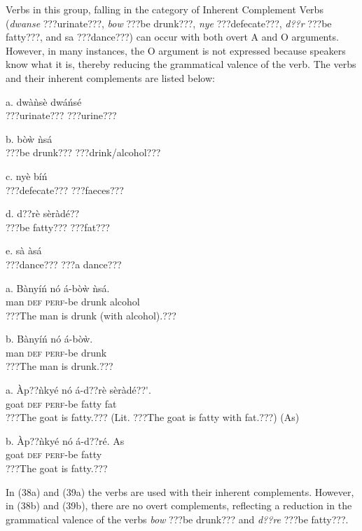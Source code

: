 \documentclass[output=paper]{langsci/langscibook}
\begin{document}
Verbs in this group, falling in the category of Inherent Complement Verbs (\emph{dwanse} ???urinate???, \emph{bow} ???be drunk???, \emph{nye} ???defecate???, \emph{d??r} ???be fatty???, and sa ???dance???) can occur with both overt A and O arguments. However, in many instances, the O argument is not expressed because speakers know what it is, thereby reducing the grammatical valence of the verb. The verbs and their inherent complements are listed below:


\ea
a.  dwàǹsè   dwáńsé\\
\glt   ???urinate???  ???urine???
\z

\ea
b.  bòẁ    ǹsá\\
\glt   ???be drunk???  ???drink/alcohol???
\z

\ea
c.  nyè    bíń\\
\glt   ???defecate???  ???faeces???
\z

\ea
d.  d??rè    sèràdé??\\
\glt   ???be fatty???  ???fat???
\z

\ea
e.  sà    àsá\\
\glt   ???dance???    ???a dance???
\z

\ea
\gll a.  Bànyíń  nó  á-bòẁ    ǹsá.\\
       man  \textsc{def}  \textsc{perf}{}-be drunk  alcohol\\
\glt ???The man is drunk (with alcohol).???
\z

\ea
\gll  b.  Bànyíń  nó  á-bòẁ.\\
       man  \textsc{def}  \textsc{perf}{}-be drunk\\
\glt ???The man is drunk.???
\z

\ea
\gll a.  \`{A}p??ǹkyé  nó  á-d??rè      sèràdé??\'{ }.\\
       goat    \textsc{def}  \textsc{perf}{}-be fatty    fat\\
\glt   ???The goat is fatty.??? (Lit. ???The goat is fatty with fat.???) (As)
\z

\ea
\gll  b.  \`{A}p??ǹkyé  nó  á-d??ré.      As\\
       goat    \textsc{def}  \textsc{perf}{}-be fatty  \\
\glt   ???The goat is fatty.???
\z

In (38a) and (39a) the verbs are used with their inherent complements. However, in (38b) and (39b), there are no overt complements, reflecting a reduction in the grammatical valence of the verbs \emph{bow} ???be drunk??? and \emph{d??re} ???be fatty???.
\end{document}
